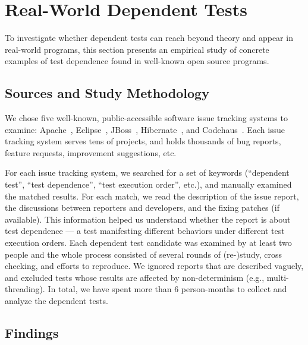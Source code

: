 \section{Real-World Dependent Tests}
\label{sec:study}

To investigate whether dependent tests can reach beyond theory
and appear in real-world programs, this section presents an empirical
study of concrete examples of test dependence found in
well-known open source programs. 


\subsection{Sources and Study Methodology}

We chose five well-known, public-accessible software issue
tracking systems to examine: Apache~\cite{apachebug},
Eclipse~\cite{eclipsebug}, JBoss~\cite{jbossbug},
Hibernate~\cite{hibernatebug}, and Codehaus~\cite{codehausbug}.
Each issue tracking system serves tens of projects, and
holds thousands of bug reports, feature requests, improvement
suggestions, etc.

For each issue tracking system, we searched for a set of keywords
(``dependent test'', ``test dependence'', ``test execution order'',
etc.), and manually examined the matched results. For each match, we read the
description of the issue report, the discussions between reporters
and developers, and the fixing patches (if available). This information
helped us understand whether the report is about test dependence
--- a test manifesting different behaviors under different
test execution orders. Each dependent test candidate was examined by
at least two people and the whole process consisted of several
rounds of (re-)study, cross checking, and efforts to reproduce. We ignored reports
that are described vaguely, and excluded tests whose results are
affected by non-determinism (e.g., multi-threading).
In total, we have spent more than 6 person-months to collect and analyze
the dependent tests. 


\subsection{Findings}

